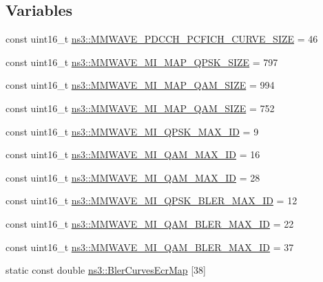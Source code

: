 \subsection*{Variables}
\begin{DoxyCompactItemize}
\item 
const uint16\+\_\+t \hyperlink{namespacens3_a69286b44393a21a43606656b4e12266f}{ns3\+::\+M\+M\+W\+A\+V\+E\+\_\+\+P\+D\+C\+C\+H\+\_\+\+P\+C\+F\+I\+C\+H\+\_\+\+C\+U\+R\+V\+E\+\_\+\+S\+I\+ZE} = 46
\item 
const uint16\+\_\+t \hyperlink{namespacens3_a95f85ca0d071fe6fd4c1a5b731d945c8}{ns3\+::\+M\+M\+W\+A\+V\+E\+\_\+\+M\+I\+\_\+\+M\+A\+P\+\_\+\+Q\+P\+S\+K\+\_\+\+S\+I\+ZE} = 797
\item 
const uint16\+\_\+t \hyperlink{namespacens3_ae8c5f0c3c246a80749c417de3d0cbadc}{ns3\+::\+M\+M\+W\+A\+V\+E\+\_\+\+M\+I\+\_\+\+M\+A\+P\+\_\+Q\+A\+M\+\_\+\+S\+I\+ZE} = 994
\item 
const uint16\+\_\+t \hyperlink{namespacens3_a693bce071814cd94149a8f263633e038}{ns3\+::\+M\+M\+W\+A\+V\+E\+\_\+\+M\+I\+\_\+\+M\+A\+P\+\_\+Q\+A\+M\+\_\+\+S\+I\+ZE} = 752
\item 
const uint16\+\_\+t \hyperlink{namespacens3_a08725fa6d069486f1625e23b79f05327}{ns3\+::\+M\+M\+W\+A\+V\+E\+\_\+\+M\+I\+\_\+\+Q\+P\+S\+K\+\_\+\+M\+A\+X\+\_\+\+ID} = 9
\item 
const uint16\+\_\+t \hyperlink{namespacens3_accc1be2d986d75b75bfc1e6ab577d74a}{ns3\+::\+M\+M\+W\+A\+V\+E\+\_\+\+M\+I\+\_\+Q\+A\+M\+\_\+\+M\+A\+X\+\_\+\+ID} = 16
\item 
const uint16\+\_\+t \hyperlink{namespacens3_a949a0cf524cae7e455c0066c367d25ba}{ns3\+::\+M\+M\+W\+A\+V\+E\+\_\+\+M\+I\+\_\+Q\+A\+M\+\_\+\+M\+A\+X\+\_\+\+ID} = 28
\item 
const uint16\+\_\+t \hyperlink{namespacens3_ac41c162344e2a292e1ffec45a90018d5}{ns3\+::\+M\+M\+W\+A\+V\+E\+\_\+\+M\+I\+\_\+\+Q\+P\+S\+K\+\_\+\+B\+L\+E\+R\+\_\+\+M\+A\+X\+\_\+\+ID} = 12
\item 
const uint16\+\_\+t \hyperlink{namespacens3_aef6c2aa1bc5c09f0f18e7dfcf548516a}{ns3\+::\+M\+M\+W\+A\+V\+E\+\_\+\+M\+I\+\_\+Q\+A\+M\+\_\+\+B\+L\+E\+R\+\_\+\+M\+A\+X\+\_\+\+ID} = 22
\item 
const uint16\+\_\+t \hyperlink{namespacens3_afe698c6008741230916101525da201c3}{ns3\+::\+M\+M\+W\+A\+V\+E\+\_\+\+M\+I\+\_\+Q\+A\+M\+\_\+\+B\+L\+E\+R\+\_\+\+M\+A\+X\+\_\+\+ID} = 37
\item 
static const double \hyperlink{namespacens3_aea9df233b95c667ad4b2249bfb203f64}{ns3\+::\+Bler\+Curves\+Ecr\+Map} \mbox{[}38\mbox{]}

\end{DoxyCompactItemize}
